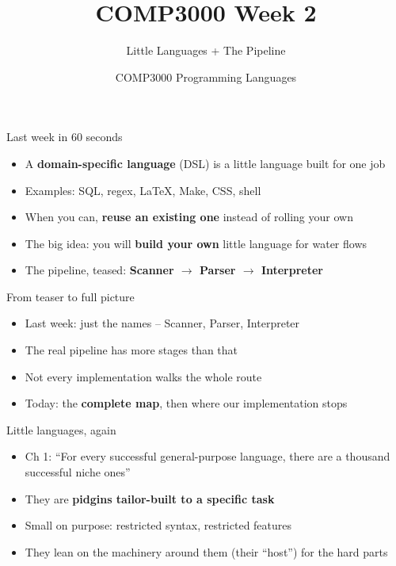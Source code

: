\documentclass[
  ignorenonframetext,
]{beamer}
\title{COMP3000 Week 2}
\subtitle{Little Languages + The Pipeline}
\author{COMP3000 Programming Languages}
\date{}
\providecommand{\tightlist}{%
  \setlength{\itemsep}{0pt}\setlength{\parskip}{0pt}}
\begin{document}
\frame{\titlepage}

\begin{frame}{Last week in 60 seconds}
\label{last-week-in-60-seconds}
\begin{itemize}
\tightlist
\item
  A \textbf{domain-specific language} (DSL) is a little language built
  for one job
\item
  Examples: SQL, regex, LaTeX, Make, CSS, shell
\item
  When you can, \textbf{reuse an existing one} instead of rolling your
  own
\item
  The big idea: you will \textbf{build your own} little language for
  water flows
\item
  The pipeline, teased: \textbf{Scanner \(\rightarrow\) Parser
  \(\rightarrow\) Interpreter}
\end{itemize}

\end{frame}

\begin{frame}{From teaser to full picture}
\label{from-teaser-to-full-picture}
\begin{itemize}
\tightlist
\item
  Last week: just the names -- Scanner, Parser, Interpreter
\item
  The real pipeline has more stages than that
\item
  Not every implementation walks the whole route
\item
  Today: the \textbf{complete map}, then where our implementation stops
\end{itemize}

\end{frame}

\begin{frame}{Little languages, again}
\label{little-languages-again}
\begin{itemize}
\tightlist
\item
  Ch 1: ``For every successful general-purpose language, there are a
  thousand successful niche ones''
\item
  They are \textbf{pidgins tailor-built to a specific task}
\item
  Small on purpose: restricted syntax, restricted features
\item
  They lean on the machinery around them (their ``host'') for the hard
  parts
\end{itemize}

\end{frame}
\end{document}
